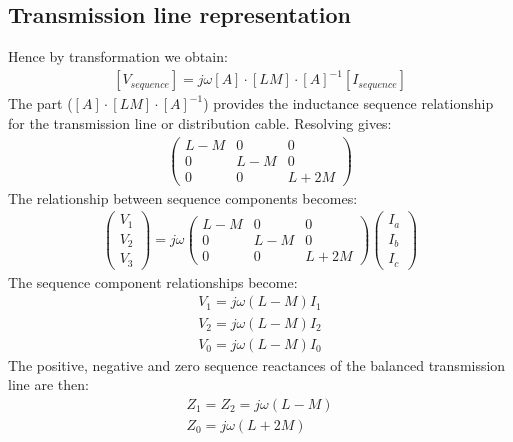 \documentclass[class=report, crop=false, 12pt,a4paper]{standalone}
\begin{document}
\subsection{Transmission line representation}
Hence by transformation we obtain:
\begin{gather}
	\left[V_{sequence}\right] = j\omega\left[A\right]\cdot \left[LM\right]\cdot\left[A\right]^{-1}\left[I_{sequence}\right]
\end{gather}
The part ($\left[A\right]\cdot \left[LM\right]\cdot\left[A\right]^{-1}$) provides the inductance sequence relationship for the transmission line or distribution cable. Resolving gives:
\begin{gather}
	\begin{pmatrix}
		L-M & 0 & 0 \\
		0 & L- M & 0 \\
		0 & 0 & L+2M
	\end{pmatrix}
\end{gather}
The relationship between sequence components becomes:
\begin{gather}
	\begin{pmatrix}
		V_1\\
		V_2\\
		V_3
	\end{pmatrix} = j \omega \begin{pmatrix}
		L-M & 0 & 0 \\
		0 & L- M & 0 \\
		0 & 0 & L+2M
	\end{pmatrix} \begin{pmatrix}
		I_a\\
		I_b\\
		I_c
	\end{pmatrix}
\end{gather}
The sequence component relationships become:
\begin{gather}
	V_1 = j\omega \left(L - M\right)I_1\\
	V_2 = j\omega \left(L - M\right)I_2\\
	V_0 = j\omega \left(L - M\right)I_0
\end{gather}
The positive, negative and zero sequence reactances of the balanced transmission line are then:
\begin{gather}
	Z_1 = Z_2 = j\omega \left(L-M\right) \\
	Z_0 = j\omega \left(L+2M\right)
\end{gather}
\end{document}
